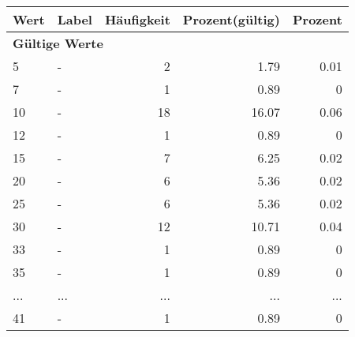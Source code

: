      \begin{longtable}{lXrrr}
     \toprule
     \textbf{Wert} & \textbf{Label} & \textbf{Häufigkeit} & \textbf{Prozent(gültig)} & \textbf{Prozent} \\
     \endhead
     \midrule
     \multicolumn{5}{l}{\textbf{Gültige Werte}}\\
        5 & \multicolumn{1}{X}{-} & %
          \num{2} &
          \num[round-mode=places,round-precision=2]{1,79} &
          \num[round-mode=places,round-precision=2]{0,01} \\
        7 & \multicolumn{1}{X}{-} & %
          \num{1} &
          \num[round-mode=places,round-precision=2]{0,89} &
          \num[round-mode=places,round-precision=2]{0} \\
        10 & \multicolumn{1}{X}{-} & %
          \num{18} &
          \num[round-mode=places,round-precision=2]{16,07} &
          \num[round-mode=places,round-precision=2]{0,06} \\
        12 & \multicolumn{1}{X}{-} & %
          \num{1} &
          \num[round-mode=places,round-precision=2]{0,89} &
          \num[round-mode=places,round-precision=2]{0} \\
        15 & \multicolumn{1}{X}{-} & %
          \num{7} &
          \num[round-mode=places,round-precision=2]{6,25} &
          \num[round-mode=places,round-precision=2]{0,02} \\
        20 & \multicolumn{1}{X}{-} & %
          \num{6} &
          \num[round-mode=places,round-precision=2]{5,36} &
          \num[round-mode=places,round-precision=2]{0,02} \\
        25 & \multicolumn{1}{X}{-} & %
          \num{6} &
          \num[round-mode=places,round-precision=2]{5,36} &
          \num[round-mode=places,round-precision=2]{0,02} \\
        30 & \multicolumn{1}{X}{-} & %
          \num{12} &
          \num[round-mode=places,round-precision=2]{10,71} &
          \num[round-mode=places,round-precision=2]{0,04} \\
        33 & \multicolumn{1}{X}{-} & %
          \num{1} &
          \num[round-mode=places,round-precision=2]{0,89} &
          \num[round-mode=places,round-precision=2]{0} \\
        35 & \multicolumn{1}{X}{-} & %
          \num{1} &
          \num[round-mode=places,round-precision=2]{0,89} &
          \num[round-mode=places,round-precision=2]{0} \\
       ... & ... & ... & ... & ... \\
        41 & \multicolumn{1}{X}{-} & %
          \num{1} &
          \num[round-mode=places,round-precision=2]{0,89} &
          \num[round-mode=places,round-precision=2]{0} \\


\end{longtable}
